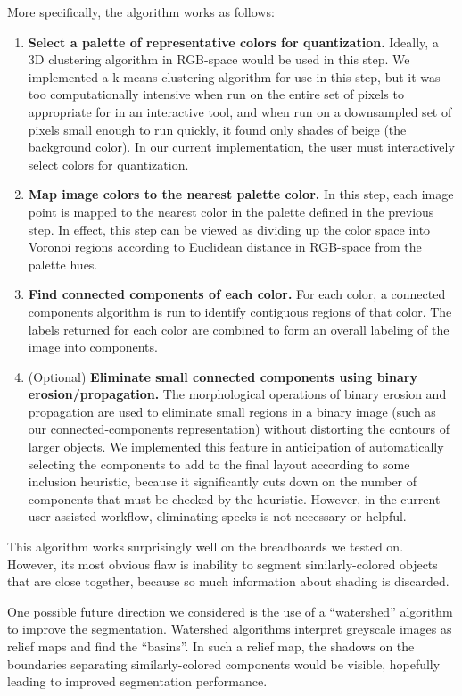 \documentclass[10pt,twocolumn,letterpaper]{article}
\begin{document}
More specifically, the algorithm works as follows:
\begin{enumerate}
\item \textbf{Select a palette of representative colors for
  quantization.} Ideally, a 3D clustering algorithm in RGB-space would
  be used in this step. We implemented a k-means clustering algorithm
  for use in this step, but it was too computationally intensive when
  run on the entire set of pixels to appropriate for in an interactive
  tool, and when run on a downsampled set of pixels small enough to
  run quickly, it found only shades of beige (the background
  color). In our current implementation, the user must interactively
  select colors for quantization.
\item \textbf{Map image colors to the nearest palette color.}
  In this step, each image point is mapped to the nearest color
  in the palette defined in the previous step. In effect, this step
  can be viewed as dividing up the color space into Voronoi regions
  according to Euclidean distance in RGB-space from the palette hues.
\item \textbf{Find connected components of each color.} For each
  color, a connected components algorithm is run to identify
  contiguous regions of that color. The labels returned for each color
  are combined to form an overall labeling of the image into components.
\item (Optional) \textbf{Eliminate small connected components using
  binary erosion/propagation.} The morphological operations of binary
  erosion and propagation are used to eliminate small regions in
  a binary image (such as our connected-components representation)
  without distorting the contours of larger objects. We implemented
  this feature in anticipation of automatically selecting the
  components to add to the final layout according to some inclusion
  heuristic, because it significantly cuts down on the number of
  components that must be checked by the heuristic. However, in the
  current user-assisted workflow, eliminating specks is not necessary
  or helpful.
\end{enumerate}

This algorithm works surprisingly well on the breadboards we tested
on. However, its most obvious flaw is inability to segment
similarly-colored objects that are close together, because so much
information about shading is discarded.

One possible future direction we considered is the use of a
``watershed'' algorithm to improve the segmentation. Watershed
algorithms interpret greyscale images as relief maps and find the
``basins''. In such a relief map, the shadows on the boundaries
separating similarly-colored components would be visible, hopefully
leading to improved segmentation performance.
\end{document}
